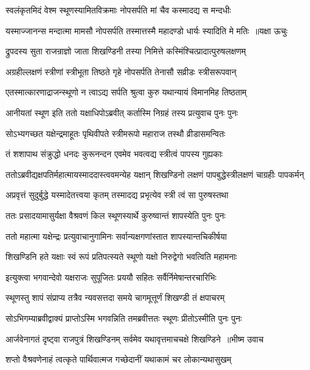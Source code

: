 \twolineshloka
{स्वलंकृतमिदं वेश्म स्थूणस्यामितविक्रमाः}
{नोपसर्पति मां चैव कस्मादद्य स मन्दधीः}


\threelineshloka
{यस्माज्जानन्स मन्दात्मा मामसौ नोपसर्पति}
{तस्मात्तस्मै महादण्डो धार्यः स्यादिति मे मतिः ॥यक्षा ऊचुः}
{}


\twolineshloka
{द्रुपदस्य सुता राजन्राज्ञो जाता शिखण्डिनी}
{तस्या निमित्ते कस्मिंश्चित्प्रादात्पुरुषलक्षणम्}


\twolineshloka
{अग्रहील्लक्षणं स्त्रीणां स्त्रीभूता तिष्ठते गृहे}
{नोपसर्पति तेनासौ सव्रीडः स्त्रीसरूपवान्}


\twolineshloka
{एतस्मात्कारणाद्राजन्स्थूणो न त्वाऽद्य सर्पति}
{श्रुत्वा कुरु यथान्यायं विमानमिह तिष्ठताम्}


\twolineshloka
{आनीयतां स्थूण इति ततो यक्षाधिपोऽब्रवीत्}
{कर्तास्मि निग्रहं तस्य प्रत्युवाच पुनः पुनः}


\twolineshloka
{सोऽभ्यगच्छत यक्षेन्द्रमाहूतः पृथिवीपते}
{स्त्रीमरूपो महाराज तस्थौ व्रीडासमन्वितः}


\twolineshloka
{तं शशापाथ संक्रुद्धो धनदः कुरूनन्दन}
{एवमेव भवत्वद्य स्त्रीत्वं पापस्य गुह्यकाः}


\twolineshloka
{ततोऽब्रवीद्यक्षपतिर्महात्मायस्माददास्त्ववमन्येह यक्षान्}
{शिखण्डिनो लक्षणं पापबुद्धेस्त्रीलक्षणं चाग्रहीः पापकर्मन्}


\twolineshloka
{अप्रवृत्तं सुदुर्बुद्धे यस्मादेतत्त्वया कृतम्}
{तस्मादद्य प्रभृत्येव स्त्री त्वं सा पुरुषस्तथा}


\twolineshloka
{ततः प्रसादयामासुर्यक्षा वैश्रवणं किल}
{स्थूणस्यार्थे कुरुष्वान्तं शापस्येति पुनः पुनः}


\twolineshloka
{ततो महात्मा यक्षेन्द्रः प्रत्युवाचानुगामिनः}
{सर्वान्यक्षगणांस्तात शापस्यान्तचिकीर्षया}


\twolineshloka
{शिखण्डिनि हते यक्षाः स्वं रूपं प्रतिपत्स्यते}
{स्थूणो यक्षो निरुद्वेगो भवत्विति महामनाः}


\twolineshloka
{इत्युक्त्वा भगवान्देवो यक्षराजः सुपूजितः}
{प्रययौ सहितः सर्वैर्निमेषान्तरचारिभिः}


\twolineshloka
{स्थूणस्तु शापं संप्राप्य तत्रैव न्यवसत्तदा}
{समये चागमूत्तूर्णं शिखण्डी तं क्षपाचरम्}


\twolineshloka
{सोऽभिगम्याब्रवीद्वाक्यं प्राप्तोऽस्मि भगवन्निति}
{तमब्रवीत्ततः स्थूणः प्रीतोऽस्मीति पुनः पुनः}


\threelineshloka
{आर्जवेनागतं दृष्ट्वा राजपुत्रं शिखण्डिनम्}
{सर्वमेव यथावृत्तमाचचक्षे शिखण्डिने ॥भीष्म उवाच}
{}


\twolineshloka
{शप्तो वैश्रवणेनाहं त्वत्कृते पार्थिवात्मज}
{गच्छेदानीं यथाकामं चर लोकान्यथासुखम्}


